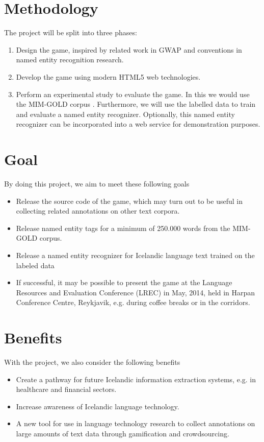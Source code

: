 \documentclass[11pt]{article}
\begin{document}
\section{Methodology}
The project will be split into three phases:
\begin{enumerate}
 \item Design the game, inspired by related work in GWAP and conventions in
     named entity recognition research.
 \item Develop the game using modern HTML5 web technologies.
 \item Perform an experimental study to evaluate the game. In this we would use
     the MIM-GOLD corpus \cite{helgadottir_tagged_2012}. Furthermore, we will
     use the labelled data to train and evaluate a named entity recognizer.
     Optionally, this named entity recognizer can be incorporated into a web
     service for demonstration purposes.
\end{enumerate}

\section{Goal}
By doing this project, we aim to meet these following goals
\begin{itemize}
    \item Release the source code of the game, which may turn out to be useful
        in collecting related annotations on other text corpora.
    \item Release named entity tags for a minimum of 250.000 words from the
        MIM-GOLD corpus.
    \item Release a named entity recognizer for Icelandic language text trained
        on the labeled data
    \item If successful, it may be possible to present the game at the Language
        Resources and Evaluation Conference (LREC) in May, 2014, held in Harpan
        Conference Centre, Reykjavik, e.g. during coffee breaks or in the
        corridors.
\end{itemize}


\section{Benefits}
With the project, we also consider the following benefits
\begin{itemize}
    \item Create a pathway for future Icelandic information extraction systems,
        e.g. in healthcare and financial sectors.
    \item Increase awareness of Icelandic language technology.
    \item A new tool for use in language technology research to collect
        annotations on large amounts of text data through gamification and
        crowdsourcing.
\end{itemize}
\end{document}
